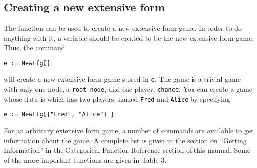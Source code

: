 \section{}

\subsection{Creating a new extensive form}

The function  can be used to create a new extensive form
game.  In order to do anything with it, a variable should be created
to be the new extensive form game.  Thus, the command

\begin{verbatim}
e := NewEfg[]
\end{verbatim}

\noindent will create a new extensive form game stored in \verb+e+.
The game is a trivial game with only one node, a \verb+root node+, and
one player, \verb+chance+.  You can create a game whose data is which
has two players, named \verb+Fred+ and \verb+Alice+ by specifying


\begin{verbatim}
e := NewEfg[{"Fred", "Alice"} ]
\end{verbatim}

For an arbitrary extensive form game, a number of commands are
available to get information about the game.  A complete list is given
in the section on ``Getting Information'' in the Categorical Function
Reference section of this manual.  Some of the more important
functions are given in Table 3.  

